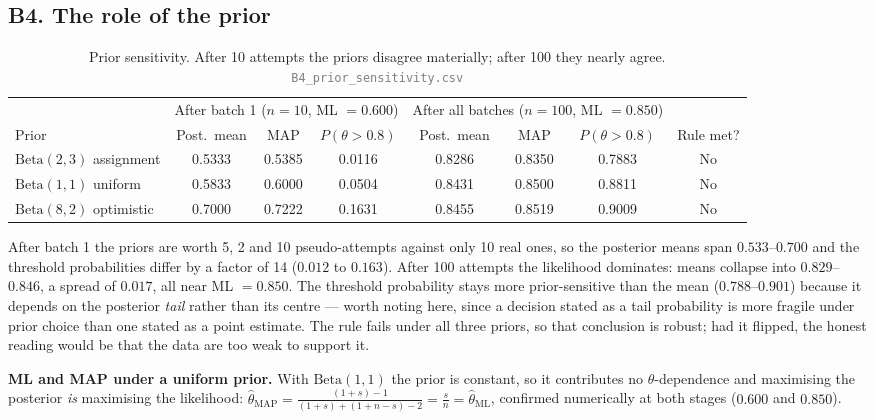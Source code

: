 \documentclass[10pt,a4paper]{article}
\begin{document}
\subsection{B4. The role of the prior}

\begin{table}[H]\centering\small
\caption{Prior sensitivity. After 10 attempts the priors disagree materially; after 100 they nearly
agree. \textcolor{gray}{\small\texttt{B4\_prior\_sensitivity.csv}}}
\label{tab:Bprior}
\begin{tabular}{lccccccc}
\toprule
& \multicolumn{3}{c}{After batch 1 ($n{=}10$, ML $=0.600$)} & \multicolumn{3}{c}{After all batches ($n{=}100$, ML $=0.850$)} & \\
\cmidrule(lr){2-4}\cmidrule(lr){5-7}
Prior & Post.\ mean & MAP & $P(\theta{>}0.8)$ & Post.\ mean & MAP & $P(\theta{>}0.8)$ & Rule met? \\
\midrule
$\mathrm{Beta}(2,3)$ assignment & 0.5333 & 0.5385 & 0.0116 & 0.8286 & 0.8350 & 0.7883 & No \\
$\mathrm{Beta}(1,1)$ uniform    & 0.5833 & 0.6000 & 0.0504 & 0.8431 & 0.8500 & 0.8811 & No \\
$\mathrm{Beta}(8,2)$ optimistic & 0.7000 & 0.7222 & 0.1631 & 0.8455 & 0.8519 & 0.9009 & No \\
\bottomrule
\end{tabular}
\end{table}

After batch 1 the priors are worth 5, 2 and 10 pseudo-attempts against only 10 real ones, so the
posterior means span $0.533$--$0.700$ and the threshold probabilities differ by a factor of 14
($0.012$ to $0.163$). After 100 attempts the likelihood dominates: means collapse into
$0.829$--$0.846$, a spread of $0.017$, all near ML $=0.850$. The threshold probability stays more
prior-sensitive than the mean ($0.788$--$0.901$) because it depends on the posterior \emph{tail}
rather than its centre --- worth noting here, since a decision stated as a tail probability is more
fragile under prior choice than one stated as a point estimate. The rule fails under all three priors,
so that conclusion is robust; had it flipped, the honest reading would be that the data are too weak
to support it.

\textbf{ML and MAP under a uniform prior.} With $\mathrm{Beta}(1,1)$ the prior is constant, so it
contributes no $\theta$-dependence and maximising the posterior \emph{is} maximising the likelihood:
$\hat\theta_{\mathrm{MAP}}=\frac{(1+s)-1}{(1+s)+(1+n-s)-2}=\frac{s}{n}=\hat\theta_{\mathrm{ML}}$,
confirmed numerically at both stages ($0.600$ and $0.850$).
\end{document}
